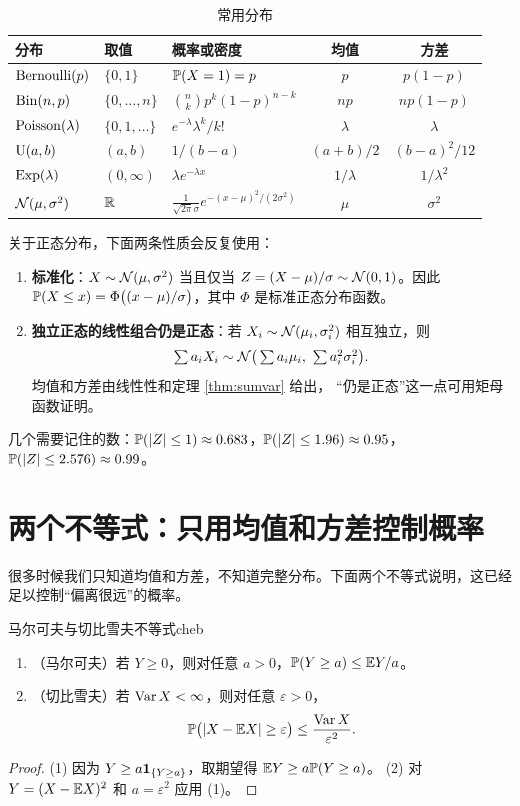 \begin{table}[H]
\centering\small
\caption{常用分布}\label{tab:dists}
\begin{tabular}{l l l c c}
\toprule
分布 & 取值 & 概率或密度 & 均值 & 方差\\
\midrule
$\Bern(p)$ & $\{0,1\}$ & $\P(X=1)=p$ & $p$ & $p(1-p)$ \\
$\Bin(n,p)$ & $\{0,\dots,n\}$ & $\binom nk p^k(1-p)^{n-k}$ & $np$ & $np(1-p)$ \\
$\Pois(\lambda)$ & $\{0,1,\dots\}$ & $e^{-\lambda}\lambda^k/k!$ & $\lambda$ & $\lambda$ \\
$\Unif(a,b)$ & $(a,b)$ & $1/(b-a)$ & $(a+b)/2$ & $(b-a)^2/12$ \\
$\Exp(\lambda)$ & $(0,\infty)$ & $\lambda e^{-\lambda x}$ & $1/\lambda$ & $1/\lambda^2$ \\
$\N(\mu,\sigma^2)$ & $\R$ & $\frac{1}{\sqrt{2\pi}\sigma}e^{-(x-\mu)^2/(2\sigma^2)}$ & $\mu$ & $\sigma^2$ \\
\bottomrule
\end{tabular}
\end{table}

\noindent 关于正态分布，下面两条性质会反复使用：
\begin{enumerate}
\item \textbf{标准化}：$X\sim\N(\mu,\sigma^2)$ 当且仅当 $Z=(X-\mu)/\sigma\sim\N(0,1)$。因此
$\P(X\le x)=\Phi\big((x-\mu)/\sigma\big)$，其中 $\Phi$ 是标准正态分布函数。
\item \textbf{独立正态的线性组合仍是正态}：若 $X_i\sim\N(\mu_i,\sigma_i^2)$ 相互独立，则
\[
\textstyle\sum a_iX_i\sim\N\big(\sum a_i\mu_i,\ \sum a_i^2\sigma_i^2\big).
\]
均值和方差由线性性和定理 \ref{thm:sumvar} 给出，
“仍是正态”这一点可用矩母函数证明。
\end{enumerate}
几个需要记住的数：$\P(|Z|\le1)\approx0.683$，$\P(|Z|\le1.96)\approx0.95$，$\P(|Z|\le2.576)\approx0.99$。

\section{两个不等式：只用均值和方差控制概率}

很多时候我们只知道均值和方差，不知道完整分布。下面两个不等式说明，这已经足以控制“偏离很远”的概率。

\begin{theorem}{马尔可夫与切比雪夫不等式}{cheb}
\begin{enumerate}
\item（马尔可夫）若 $Y\ge0$，则对任意 $a>0$，$\P(Y\ge a)\le \E Y/a$。
\item（切比雪夫）若 $\Var X<\infty$，则对任意 $\varepsilon>0$，
\[
\P\big(|X-\E X|\ge\varepsilon\big)\le\frac{\Var X}{\varepsilon^2}.
\]
\end{enumerate}
\end{theorem}
\begin{proof}
(1) 因为 $Y\ge a\1_{\{Y\ge a\}}$，取期望得 $\E Y\ge a\P(Y\ge a)$。
(2) 对 $Y=(X-\E X)^2$ 和 $a=\varepsilon^2$ 应用 (1)。
\end{proof}

